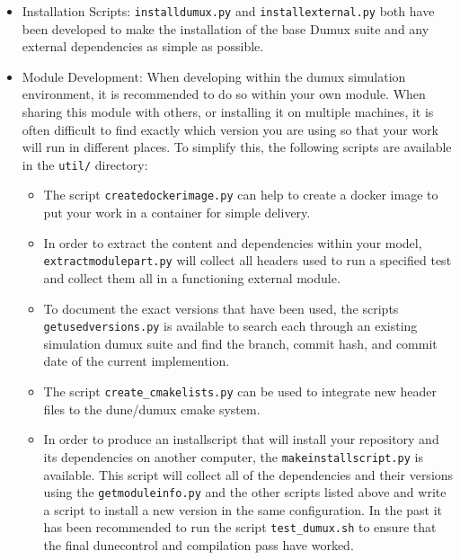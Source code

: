 \begin{itemize}
  \item Installation Scripts: \texttt{installdumux.py} and \texttt{installexternal.py} both have been developed to make the installation of the base Dumux suite and any external dependencies as simple as possible. 
  \item Module Development: When developing within the dumux simulation environment, it is recommended to do so within your own module. When sharing this module with others, or installing it on multiple machines, it is often difficult to find exactly which version you are using so that your work will run in different places. To simplify this, the following scripts are available in the \texttt{util/} directory: 
  	\begin{itemize}
  		\item The script \texttt{createdockerimage.py} can help to create a docker image to put your work in a container for simple delivery.
		\item In order to extract the content and dependencies within your model, \texttt{extractmodulepart.py} will collect all headers used to run a specified test and collect them all in a functioning external module.
		\item To document the exact versions that have been used, the scripts \texttt{getusedversions.py} is available to search each through an existing simulation dumux suite and find the branch, commit hash, and commit date of the current implemention. 
		\item The script \texttt{create\_cmakelists.py} can be used to integrate new header files to the dune/dumux cmake system.
		\item In order to produce an installscript that will install your repository and its dependencies on another computer, the \texttt{makeinstallscript.py} is available. This script will collect all of the dependencies and their versions using the \texttt{getmoduleinfo.py} and the other scripts listed above and write a script to install a new version in the same configuration. In the past it has been recommended to run the script \texttt{test\_dumux.sh} to ensure that the final dunecontrol and compilation pass have worked. 
  	\end{itemize} 
\end{itemize}

